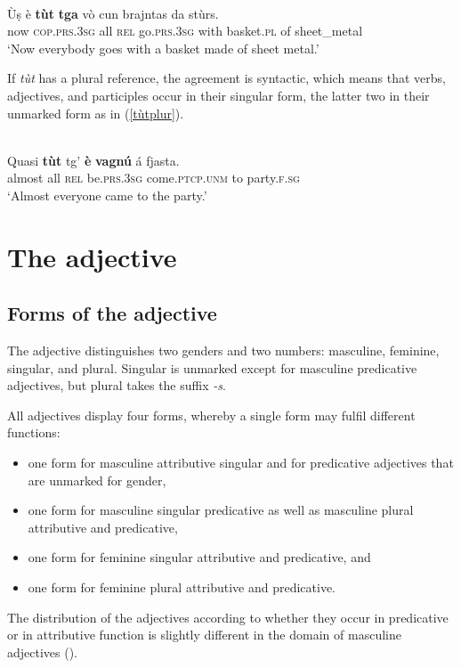 \ea
\label{}
\\
\gll  Ùṣ è \textbf{tùt} \textbf{tga} vò cun brajntas da stùrs.\\
now \textsc{cop.prs.3sg} all \textsc{rel} go.\textsc{prs.3sg} with basket.\textsc{pl} of sheet\_metal\\
\glt `Now everybody goes with a basket made of sheet metal.'
\z

If \textit{tùt} has a plural reference, the agreement is syntactic, which means that verbs, adjectives, and participles occur in their singular form, the latter two in their unmarked form as in (\ref{tùtplur}).

\ea\label{tùtplur}
\\
\gll  Quasi \textbf{tùt} tg' \textbf{è} \textbf{vagnú} á fjasta.\\
almost all \textsc{rel} be.\textsc{prs.3sg} come.\textsc{ptcp.unm} to party.\textsc{f.sg}\\
\glt `Almost everyone came to the party.'
\z


\section{The adjective}
\subsection{Forms of the adjective}
The adjective distinguishes two genders and two numbers: masculine, feminine, singular, and plural. Singular is unmarked except for masculine predicative adjectives, but plural takes the suffix \textit{-s}.

All adjectives display four forms, whereby a single form may fulfil different functions:

\begin{itemize}
\item one form for masculine attributive singular and for predicative adjectives that are unmarked for gender,
\item one form for masculine singular predicative as well as masculine plural attributive and predicative,
\item one form for feminine singular attributive and predicative, and
\item one form for feminine plural attributive and predicative.
\end{itemize}

The distribution of the adjectives according to whether they occur in predicative or in attributive function is slightly different in the domain of masculine adjectives ().

